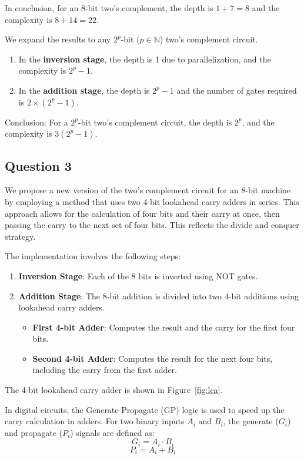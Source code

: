 \documentclass[conference]{IEEEtran}
\begin{document}
In conclusion, for an 8-bit two's complement, the depth is $1 + 7 = 8$ and the complexity is $8 + 14 = 22$.

We expand the results to any $2^p$-bit ($p \in \mathbb{N}$) two's complement circuit.

\begin{enumerate}
\item In the \textbf{inversion stage}, the depth is 1 due to parallelization, and the complexity is $2^p -1$.
\item In the \textbf{addition stage}, the depth is $2^p - 1$ and the number of gates required is $2 \times (2^p - 1)$.
\end{enumerate}

Conclusion: For a $2^p$-bit two's complement circuit, the depth is $2^p$, and the complexity is $3(2^p - 1)$.

\subsection{Question 3}

We propose a new version of the two's complement circuit for an 8-bit machine by employing a method that uses two 4-bit lookahead carry adders in series. This approach allows for the calculation of four bits and their carry at once, then passing the carry to the next set of four bits. This reflects the divide and conquer strategy.

The implementation involves the following steps:
\begin{enumerate}
    \item \textbf{Inversion Stage}: Each of the 8 bits is inverted using NOT gates.
    \item \textbf{Addition Stage}: The 8-bit addition is divided into two 4-bit additions using lookahead carry adders.
    \begin{itemize}
        \item \textbf{First 4-bit Adder}: Computes the result and the carry for the first four bits.
        \item \textbf{Second 4-bit Adder}: Computes the result for the next four bits, including the carry from the first adder.
    \end{itemize}
\end{enumerate}

The 4-bit lookahead carry adder is shown in Figure~\ref{fig:lca}.

In digital circuits, the Generate-Propagate (GP) logic is used to speed up the carry calculation in adders. For two binary inputs $A_i$ and $B_i$, the generate ($G_i$) and propagate ($P_i$) signals are defined as:
\begin{equation}
G_i = A_i \cdot B_i
\end{equation}
\begin{equation}
P_i = A_i + B_i
\end{equation}
\end{document}
